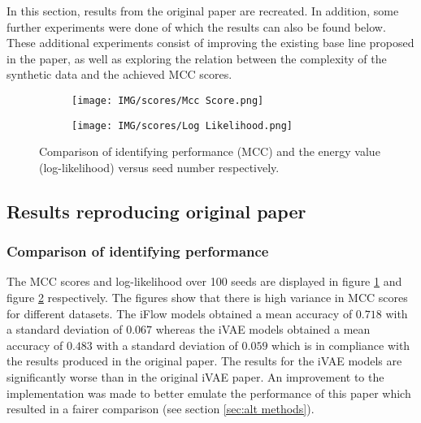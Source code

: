 In this section, results from the original paper are recreated. In addition, some further experiments were done of which the results can also be found below. These additional experiments consist of improving the existing base line proposed in the paper, as well as exploring the relation between the complexity of the synthetic data and the achieved MCC scores.

\begin{figure}[ht] 
  \begin{subfigure}[b]{0.5\linewidth}
    \centering
    \texttt{[image: IMG/scores/Mcc Score.png]}
    \caption{} 
    \label{fig:MCCscores:a} 
  \end{subfigure}%
  \begin{subfigure}[b]{0.5\linewidth}
    \centering
    \texttt{[image: IMG/scores/Log Likelihood.png]} 
    \caption{} 
    \label{fig:MCCscores:b} 
  \end{subfigure} 
  \caption{Comparison of identifying performance (MCC) and the energy value (log-likelihood) versus seed number respectively.}
  \label{fig:MCCscores}
\end{figure}

\subsection{Results reproducing original paper}

\subsubsection{Comparison of identifying performance}
The MCC scores and log-likelihood over 100 seeds are displayed in figure \ref{fig:MCCscores:a} and figure \ref{fig:MCCscores:b} respectively. The figures show that there is high variance in MCC scores for different datasets. The iFlow models obtained a mean accuracy of $0.718$ with a standard deviation of $0.067$ whereas the iVAE models obtained a mean accuracy of $0.483$ with a standard deviation of $0.059$ which is in compliance with the results produced in the original paper. The results for the iVAE models are significantly worse than in the original iVAE paper. An improvement to the implementation was made to better emulate the performance of this paper which resulted in a fairer comparison (see section \ref{sec:alt methods}). 

